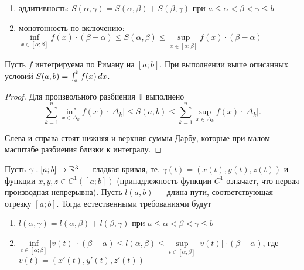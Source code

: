 \documentclass[a4paper]{article}
\theoremstyle{named}
\newcommand{\T}{\mathbb{T}}
\renewcommand{\int}{\intop}
\begin{document}
        \begin{enumerate}
        \item 
            аддитивность: $S(\alpha, \gamma) = S(\alpha, \beta) + S(\beta, \gamma)$ при $a \leq \alpha < \beta < \gamma \leq b$

        \item
            монотонность по включению: $\inf\limits_{x \in [\alpha; \beta]} f(x) \cdot (\beta - \alpha) \leq S(\alpha, \beta) \leq \sup\limits_{x \in [\alpha; \beta]} f(x) \cdot (\beta - \alpha)$ 
        \end{enumerate}

        \begin{proposal*}
            Пусть $f$ интегрируема по Риману на $[a; b]$. При выполнении выше описанных условий $S(a, b) = \int_a^b f(x) \dd x$.
        \end{proposal*}

        \begin{proof}
            Для произвольного разбиения $\T$ выполнено
            \begin{equation*}
                \sum_{k = 1}^n \inf\limits_{x \in \Delta_k} f(x) \cdot |\Delta_k| \leq S(a, b) \leq \sum_{k = 1}^n \sup_{x \in \Delta_k} f(x) \cdot |\Delta_k|.
            \end{equation*}

            Слева и справа стоят нижняя и верхняя суммы Дарбу, которые при малом масштабе разбиения близки к интегралу.
        \end{proof}

        Пусть $\gamma: [a; b] \to \mathbb{R}^3$ --- гладкая кривая, те. $\gamma(t) = (x(t), y(t), z(t))$ и функции $x, y, z \in C^1([a; b])$ (принадлежность функции $C^1$ означает, что первая производная непрерывна). Пусть $l(a, b)$ --- длина пути, соответствующая отрезку $[a; b]$. Тогда естественными требованиями будут

        \begin{enumerate}
        \item
            $l(\alpha, \gamma) = l(\alpha, \beta) + l(\beta, \gamma)$ при $a \leq \alpha < \beta < \gamma \leq b$

        \item
            $\inf\limits_{t \in [\alpha; \beta]} |v(t)| \cdot (\beta - \alpha) \leq l(\alpha, \beta) \leq \sup\limits_{t \in [\alpha; \beta]} |v(t)| \cdot (\beta - \alpha)$, где $v(t) =  (x'(t), y'(t), z'(t))$
        \end{enumerate}
\end{document}
